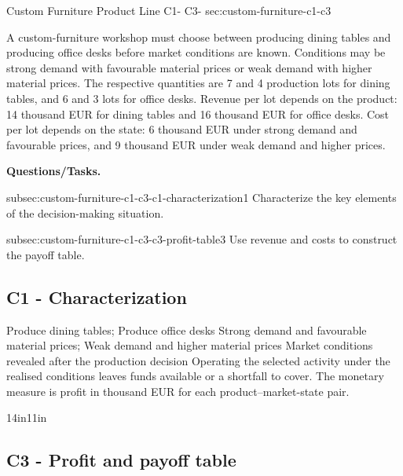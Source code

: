 	
	\sectionScored
	{Custom Furniture Product Line}
	{C1- \hspace{2mm} C3-}
	{sec:custom-furniture-c1-c3}
	{
	A custom-furniture workshop must choose between producing dining tables
	and producing office desks before market conditions are known. Conditions
	may be strong demand with favourable material prices or weak demand with
	higher material prices. The respective quantities are 7 and 4 production
	lots for dining tables, and 6 and 3 lots for office desks. Revenue per lot
	depends on the product: 14 thousand EUR for dining tables and 16 thousand
	EUR for office desks. Cost per lot depends on the state: 6 thousand EUR
	under strong demand and favourable prices, and 9 thousand EUR under weak
	demand and higher prices.
	
	\textbf{Questions/Tasks.}
	\begin{enumerate}
		\CriterionTask
		{subsec:custom-furniture-c1-c3-c1-characterization}{1}
		{Characterize the key elements of the decision-making situation. }
		
		\CriterionTask
		{subsec:custom-furniture-c1-c3-c3-profit-table}{3}
		{Use revenue and costs to construct the payoff table. }
	\end{enumerate}
	
	\label{subsec:custom-furniture-c1-c3-c1-characterization}
	\subsection*{C1 - Characterization }
	
	\DecisionElementsTable
{Produce dining tables; Produce office desks}
{Strong demand and favourable material prices; Weak demand and higher material prices}
{Market conditions revealed after the production decision}
{Operating the selected activity under the realised conditions leaves funds available or a shortfall to cover. The monetary measure is profit in thousand EUR for each product--market-state pair.}

	
	\begin{CalculationLandscape}{14in}{11in}
	\label{subsec:custom-furniture-c1-c3-c3-profit-table}
	\subsection*{C3 - Profit and payoff table }
	
	


\end{CalculationLandscape}}
